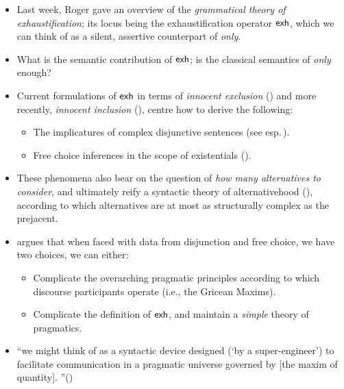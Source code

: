 \documentclass[landscape,cronos,paper=letter]{ling-handout}
\begin{document}
\begin{itemize}

    \item Last week, Roger gave an overview of the \textit{grammatical theory of exhaustification}; its locus being the exhaustification operator $\textsf{exh}$, which we can think of as a silent, assertive counterpart of \textit{only}.

    \item What is the semantic contribution of $\textsf{exh}$; is the classical semantics of \textit{only} enough?

  \item Current formulations of $\textsf{exh}$ in terms of \textit{innocent exclusion} (\citealt{fox2007}) and more recently, \textit{innocent inclusion} (\citealt{barLevFox2017}), centre how to derive the following:

    \begin{itemize}

      \item The implicatures of complex disjunctive sentences (see esp.\,\citealt{sauerland2004scalar}).

      \item Free choice inferences in the scope of existentials (\citealt{fox2007}).

    \end{itemize}

  \item These phenomena also bear on the question of \textit{how many alternatives to consider}, and ultimately reify a syntactic theory of alternativehood (\citealt{katzir2008,foxKatzir2011}), according to which alternatives are at most as structurally complex as the prejacent.

  \item \citet{fox2007} argues that when faced with data from disjunction and free choice, we have two choices, we can either:

    \begin{itemize}

        \item Complicate the overarching pragmatic principles according to which discourse participants operate (i.e., the Gricean Maxims).

        \item Complicate the definition of $\textsf{exh}$, and maintain a \textit{simple} theory of pragmatics.

    \end{itemize}

  \item \enquote{we might think of  as a syntactic device designed (‘by a super-engineer’) to facilitate communication in a pragmatic universe governed by [the maxim of quantity].
}\hfill (\citealt[p.\,80]{fox2007})

\end{itemize}
\end{document}
